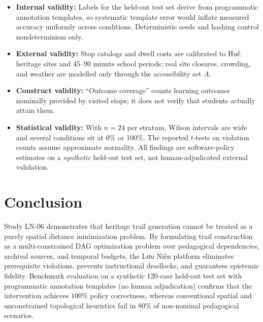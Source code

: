 \documentclass[11pt,a4paper]{article}
\begin{document}
\begin{itemize}
    \item \textbf{Internal validity:} Labels for the held-out test set derive from programmatic annotation templates, so systematic template error would inflate measured accuracy uniformly across conditions. Deterministic seeds and hashing control nondeterminism only.
    \item \textbf{External validity:} Stop catalogs and dwell costs are calibrated to Huế heritage sites and 45--90 minute school periods; real site closures, crowding, and weather are modelled only through the accessibility set $A$.
    \item \textbf{Construct validity:} ``Outcome coverage'' counts learning outcomes nominally provided by visited stops; it does not verify that students actually attain them.
    \item \textbf{Statistical validity:} With $n=24$ per stratum, Wilson intervals are wide and several conditions sit at 0\% or 100\%. The reported $t$-tests on violation counts assume approximate normality. All findings are software-policy estimates on a \emph{synthetic} held-out test set, not human-adjudicated external validation.
\end{itemize}

\section{Conclusion}
Study LN-06 demonstrates that heritage trail generation cannot be treated as a purely spatial distance minimization problem. By formulating trail construction as a multi-constrained DAG optimization problem over pedagogical dependencies, archival sources, and temporal budgets, the Lưu Niên platform eliminates prerequisite violations, prevents instructional deadlocks, and guarantees epistemic fidelity. Benchmark evaluation on a synthetic 120-case held-out test set with programmatic annotation templates (no human adjudication) confirms that the intervention achieves $100\%$ policy correctness, whereas conventional spatial and unconstrained topological heuristics fail in $80\%$ of non-nominal pedagogical scenarios.
\end{document}
